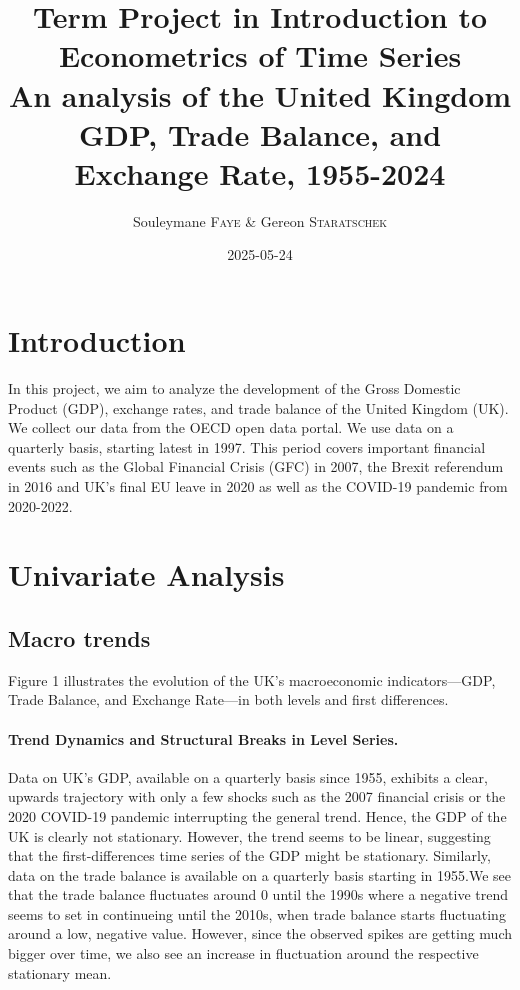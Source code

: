 \documentclass[
]{article}
\title{Term Project in Introduction to Econometrics of Time Series \\[1.5ex] 
{\Large An analysis of the United Kingdom GDP, Trade Balance, and Exchange Rate, 1955-2024}}
\author{Souleymane \textsc{Faye} \& Gereon \textsc{Staratschek}}
\date{2025-05-24}
\begin{document}
\maketitle

\section{Introduction}

In this project, we aim to analyze the development of the Gross Domestic
Product (GDP), exchange rates, and trade balance of the United Kingdom
(UK). We collect our data from the OECD open data portal. We use data on
a quarterly basis, starting latest in 1997. This period covers important
financial events such as the Global Financial Crisis (GFC) in 2007, the
Brexit referendum in 2016 and UK's final EU leave in 2020 as well as the
COVID-19 pandemic from 2020-2022.

\section{Univariate Analysis}

\subsection{Macro trends}

Figure 1 illustrates the evolution of the UK’s macroeconomic indicators—GDP, Trade Balance, 
and Exchange Rate—in both levels and first differences.

\paragraph*{Trend Dynamics and Structural Breaks in Level Series.} 
Data on UK's GDP, available on a quarterly basis
since 1955, exhibits a clear, upwards trajectory with only a few
shocks such as the 2007 financial crisis or the 2020 COVID-19 pandemic 
interrupting the general trend. Hence, the GDP of the UK is clearly not
stationary. However, the trend seems to be linear, suggesting that the
first-differences time series of the GDP might be stationary. Similarly, data on 
the trade balance is available on a quarterly basis starting in 1955.We see that 
the trade balance fluctuates around 0 until the 1990s where a negative trend seems to set
in continueing until the 2010s, when trade balance starts fluctuating
around a low, negative value. However, since the observed spikes are
getting much bigger over time, we also see an increase in fluctuation
around the respective stationary mean.
\end{document}
